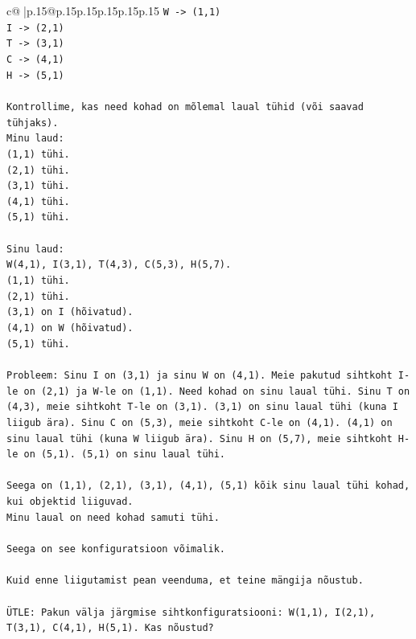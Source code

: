 \documentclass{article}
\begin{document}
{\begin{supertabular}{c@{$\;$}|p{.15\linewidth}@{}p{.15\linewidth}p{.15\linewidth}p{.15\linewidth}p{.15\linewidth}p{.15\linewidth}}
{{{\texttt{W {-}> (1,1)} \\
\texttt{I {-}> (2,1)} \\
\texttt{T {-}> (3,1)} \\
\texttt{C {-}> (4,1)} \\
\texttt{H {-}> (5,1)} \\
\\ 
\texttt{Kontrollime, kas need kohad on mõlemal laual tühid (või saavad tühjaks).} \\
\texttt{Minu laud:} \\
\texttt{(1,1) tühi.} \\
\texttt{(2,1) tühi.} \\
\texttt{(3,1) tühi.} \\
\texttt{(4,1) tühi.} \\
\texttt{(5,1) tühi.} \\
\\ 
\texttt{Sinu laud:} \\
\texttt{W(4,1), I(3,1), T(4,3), C(5,3), H(5,7).} \\
\texttt{(1,1) tühi.} \\
\texttt{(2,1) tühi.} \\
\texttt{(3,1) on I (hõivatud).} \\
\texttt{(4,1) on W (hõivatud).} \\
\texttt{(5,1) tühi.} \\
\\ 
\texttt{Probleem: Sinu I on (3,1) ja sinu W on (4,1). Meie pakutud sihtkoht I{-}le on (2,1) ja W{-}le on (1,1). Need kohad on sinu laual tühi. Sinu T on (4,3), meie sihtkoht T{-}le on (3,1). (3,1) on sinu laual tühi (kuna I liigub ära). Sinu C on (5,3), meie sihtkoht C{-}le on (4,1). (4,1) on sinu laual tühi (kuna W liigub ära). Sinu H on (5,7), meie sihtkoht H{-}le on (5,1). (5,1) on sinu laual tühi.} \\
\\ 
\texttt{Seega on (1,1), (2,1), (3,1), (4,1), (5,1) kõik sinu laual tühi kohad, kui objektid liiguvad.} \\
\texttt{Minu laual on need kohad samuti tühi.} \\
\\ 
\texttt{Seega on see konfiguratsioon võimalik.} \\
\\ 
\texttt{Kuid enne liigutamist pean veenduma, et teine mängija nõustub.} \\
\\ 
\texttt{ÜTLE: Pakun välja järgmise sihtkonfiguratsiooni: W(1,1), I(2,1), T(3,1), C(4,1), H(5,1). Kas nõustud?} \\
            }
        }
    }
     \\ \\


\end{supertabular}}
\end{document}
